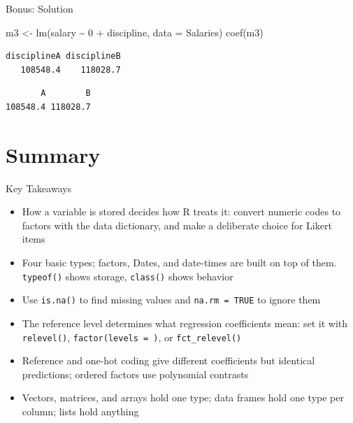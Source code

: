 \documentclass[
  ignorenonframetext,
  aspectratio=169,
]{beamer}
\newenvironment{Shaded}{\begin{snugshade}}{\end{snugshade}}
\newcommand{\AttributeTok}[1]{\textcolor[rgb]{0.40,0.45,0.13}{#1}}
\newcommand{\DecValTok}[1]{\textcolor[rgb]{0.68,0.00,0.00}{#1}}
\newcommand{\FunctionTok}[1]{\textcolor[rgb]{0.28,0.35,0.67}{#1}}
\newcommand{\NormalTok}[1]{\textcolor[rgb]{0.00,0.23,0.31}{#1}}
\newcommand{\OtherTok}[1]{\textcolor[rgb]{0.00,0.23,0.31}{#1}}
\newcommand{\SpecialCharTok}[1]{\textcolor[rgb]{0.37,0.37,0.37}{#1}}
\providecommand{\tightlist}{%
  \setlength{\itemsep}{0pt}\setlength{\parskip}{0pt}}\usepackage{longtable,booktabs,array}
\begin{document}
\begin{frame}[fragile]{Bonus: Solution}
\endgroup

\begin{Shaded}
\begin{Highlighting}[]
\NormalTok{m3 }\OtherTok{\textless{}{-}} \FunctionTok{lm}\NormalTok{(salary }\SpecialCharTok{\textasciitilde{}} \DecValTok{0} \SpecialCharTok{+}\NormalTok{ discipline, }\AttributeTok{data =}\NormalTok{ Salaries)}
\FunctionTok{coef}\NormalTok{(m3)}
\end{Highlighting}
\end{Shaded}

\begingroup\tiny\color{darkgray}

\begin{verbatim}
disciplineA disciplineB 
   108548.4    118028.7 
\end{verbatim}

\endgroup

\begin{Shaded}
\end{Shaded}

\begingroup\tiny\color{darkgray}

\begin{verbatim}
       A        B 
108548.4 118028.7 
\end{verbatim}

\endgroup
\end{frame}

\hypertarget{sec-summary}{%
\section{Summary}\label{sec-summary}}

\begin{frame}[fragile]{Key Takeaways}
\protect\hypertarget{key-takeaways}{}
\begin{itemize}
\tightlist
\item
  How a variable is stored decides how R treats it: convert numeric
  codes to factors with the data dictionary, and make a deliberate
  choice for Likert items
\item
  Four basic types; factors, Dates, and date-times are built on top of
  them. \texttt{typeof()} shows storage, \texttt{class()} shows behavior
\item
  Use \texttt{is.na()} to find missing values and
  \texttt{na.rm\ =\ TRUE} to ignore them
\item
  The reference level determines what regression coefficients mean: set
  it with \texttt{relevel()}, \texttt{factor(levels\ =\ )}, or
  \texttt{fct\_relevel()}
\item
  Reference and one-hot coding give different coefficients but identical
  predictions; ordered factors use polynomial contrasts
\item
  Vectors, matrices, and arrays hold one type; data frames hold one type
  per column; lists hold anything
\end{itemize}
\end{frame}
\end{document}
